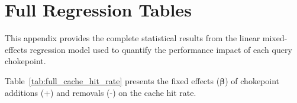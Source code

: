 \FloatBarrier      %
\clearpage         %
\onecolumn         %
\appendix

\section{Full Regression Tables}
\label{app:regression_tables}

This appendix provides the complete statistical results from the linear mixed-effects 
regression model used to quantify the performance impact of each query chokepoint. 

Table~\ref{tab:full_cache_hit_rate} presents the fixed effects ($\boldsymbol{\beta}$) 
of chokepoint additions (+) and removals (-) on the cache hit rate.

